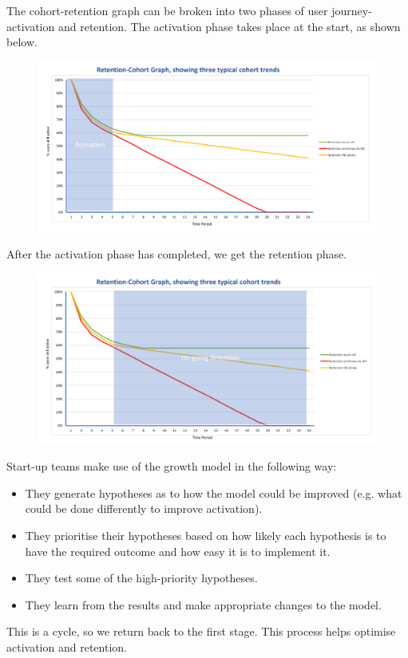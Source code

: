\documentclass[a4paper, openany]{memoir}
\begin{document}
The cohort-retention graph can be broken into two phases of user journey-activation and retention. The activation phase takes place at the start, as shown below.
\begin{figure}[H]
    \centering
    \includegraphics[scale=0.45]{src/18.16 Retention-Cohort Graph Activation Phase.PNG}
\end{figure}
\noindent After the activation phase has completed, we get the retention phase.
\begin{figure}[H]
    \centering
    \includegraphics[scale=0.45]{src/18.17 Retention-Cohort Graph Retention Phase.PNG}
\end{figure}

Start-up teams make use of the growth model in the following way:
\begin{itemize}
    \item They generate hypotheses as to how the model could be improved (e.g. what could be done differently to improve activation).
    \item They prioritise their hypotheses based on how likely each hypothesis is to have the required outcome and how easy it is to implement it.
    \item They test some of the high-priority hypotheses.
    \item They learn from the results and make appropriate changes to the model.
\end{itemize}
This is a cycle, so we return back to the first stage. This process helps optimise activation and retention.
\end{document}
